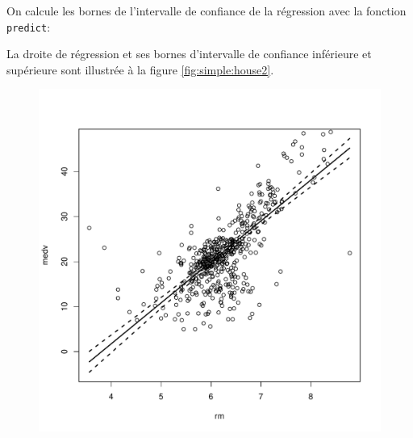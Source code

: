 \begin{solution}{2.17}
\begin{enumerate}
      On calcule les bornes de l'intervalle de confiance de la
      régression avec la fonction \texttt{predict}:
\begin{knitrout}
\color{fgcolor}\begin{kframe}
\begin{alltt}
 \hlkwb{<-}   \hlstd{=} \hlstd{,}  \hlstd{=} \hlstd{)}
\end{alltt}
\end{kframe}
\end{knitrout}
      La droite de régression et ses bornes d'intervalle de confiance
      inférieure et supérieure sont illustrée à la figure
      \ref{fig:simple:house2}.
      \begin{figure}
        \centering
\begin{knitrout}
\color{fgcolor}\begin{kframe}
\begin{alltt}
 \hlkwb{<-} \hlopt{$}
 \hlopt{~}     \hlstd{=} 
\hlopt{$}
         \hlstd{=} \hlstd{,}  \hlstd{=} \hlstd{(}\hlstd{,} \hlstd{,} \hlstd{),} \hlstd{=} \hlstd{,}
         \hlstd{=} \hlstd{,}  \hlstd{=} \hlstd{)}
\end{alltt}
\end{kframe}
\includegraphics[width=\maxwidth]{figure/unnamed-chunk-28-1}


\end{knitrout}
\end{figure}
\end{enumerate}
\end{solution}

